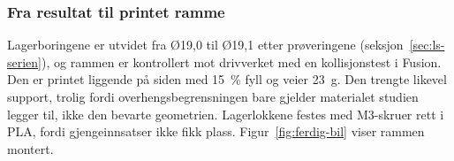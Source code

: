 \subsubsection{Fra resultat til printet ramme}
Lagerboringene er utvidet fra Ø19,0 til Ø19,1 etter prøveringene (seksjon~\ref{sec:ls-serien}), og rammen er kontrollert mot drivverket med en kollisjonstest i Fusion. Den er printet liggende på siden med \SI{15}{\percent} fyll og veier \SI{23}{g}. Den trengte likevel support, trolig fordi overhengsbegrensningen bare gjelder materialet studien legger til, ikke den bevarte geometrien. Lagerlokkene festes med M3-skruer rett i PLA, fordi gjengeinnsatser ikke fikk plass. Figur~\ref{fig:ferdig-bil} viser rammen montert.

